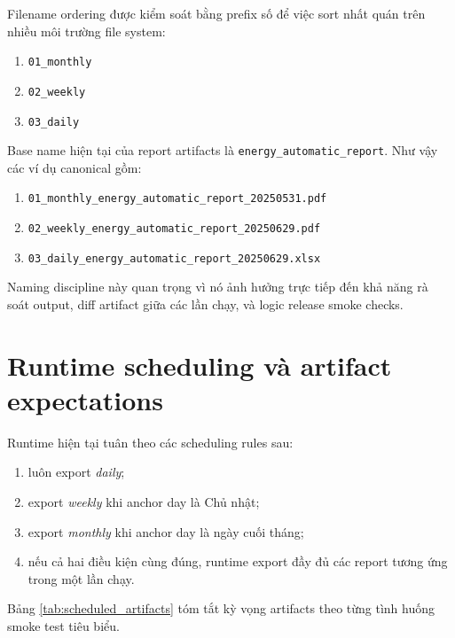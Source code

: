 Filename ordering được kiểm soát bằng prefix số để việc sort nhất quán trên nhiều môi trường file system:

\begin{enumerate}[label=-]
\item \texttt{01\_monthly}
\item \texttt{02\_weekly}
\item \texttt{03\_daily}
\end{enumerate}

Base name hiện tại của report artifacts là \texttt{energy\_automatic\_report}. Như vậy các ví dụ canonical gồm:

\begin{enumerate}[label=-]
\item \texttt{01\_monthly\_energy\_automatic\_report\_20250531.pdf}
\item \texttt{02\_weekly\_energy\_automatic\_report\_20250629.pdf}
\item \texttt{03\_daily\_energy\_automatic\_report\_20250629.xlsx}
\end{enumerate}

Naming discipline này quan trọng vì nó ảnh hưởng trực tiếp đến khả năng rà soát output, diff artifact giữa các lần chạy, và logic release smoke checks.

\section{Runtime scheduling và artifact expectations}

Runtime hiện tại tuân theo các scheduling rules sau:

\begin{enumerate}[label=-]
\item luôn export \textit{daily};
\item export \textit{weekly} khi anchor day là Chủ nhật;
\item export \textit{monthly} khi anchor day là ngày cuối tháng;
\item nếu cả hai điều kiện cùng đúng, runtime export đầy đủ các report tương ứng trong một lần chạy.
\end{enumerate}

Bảng \ref{tab:scheduled_artifacts} tóm tắt kỳ vọng artifacts theo từng tình huống smoke test tiêu biểu.


